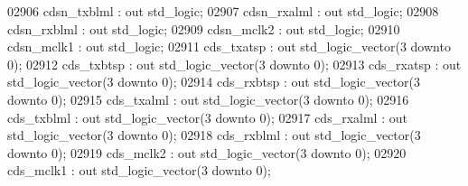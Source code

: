 \begin{DoxyCode}
02906     cdsn\_txblml   : \textcolor{keywordflow}{out} \textcolor{comment}{std\_logic};
02907     cdsn\_rxalml   : \textcolor{keywordflow}{out} \textcolor{comment}{std\_logic};
02908     cdsn\_rxblml   : \textcolor{keywordflow}{out} \textcolor{comment}{std\_logic};
02909     cdsn\_mclk2    : \textcolor{keywordflow}{out} \textcolor{comment}{std\_logic};
02910     cdsn\_mclk1    : \textcolor{keywordflow}{out} \textcolor{comment}{std\_logic};
02911     cds\_txatsp    : \textcolor{keywordflow}{out} \textcolor{comment}{std\_logic\_vector}(\textcolor{vhdllogic}{}\textcolor{vhdllogic}{3} \textcolor{keywordflow}{downto} \textcolor{vhdllogic}{}\textcolor{vhdllogic}{0});
02912     cds\_txbtsp    : \textcolor{keywordflow}{out} \textcolor{comment}{std\_logic\_vector}(\textcolor{vhdllogic}{}\textcolor{vhdllogic}{3} \textcolor{keywordflow}{downto} \textcolor{vhdllogic}{}\textcolor{vhdllogic}{0});
02913     cds\_rxatsp    : \textcolor{keywordflow}{out} \textcolor{comment}{std\_logic\_vector}(\textcolor{vhdllogic}{}\textcolor{vhdllogic}{3} \textcolor{keywordflow}{downto} \textcolor{vhdllogic}{}\textcolor{vhdllogic}{0});
02914     cds\_rxbtsp    : \textcolor{keywordflow}{out} \textcolor{comment}{std\_logic\_vector}(\textcolor{vhdllogic}{}\textcolor{vhdllogic}{3} \textcolor{keywordflow}{downto} \textcolor{vhdllogic}{}\textcolor{vhdllogic}{0});
02915     cds\_txalml    : \textcolor{keywordflow}{out} \textcolor{comment}{std\_logic\_vector}(\textcolor{vhdllogic}{}\textcolor{vhdllogic}{3} \textcolor{keywordflow}{downto} \textcolor{vhdllogic}{}\textcolor{vhdllogic}{0});
02916     cds\_txblml    : \textcolor{keywordflow}{out} \textcolor{comment}{std\_logic\_vector}(\textcolor{vhdllogic}{}\textcolor{vhdllogic}{3} \textcolor{keywordflow}{downto} \textcolor{vhdllogic}{}\textcolor{vhdllogic}{0});
02917     cds\_rxalml    : \textcolor{keywordflow}{out} \textcolor{comment}{std\_logic\_vector}(\textcolor{vhdllogic}{}\textcolor{vhdllogic}{3} \textcolor{keywordflow}{downto} \textcolor{vhdllogic}{}\textcolor{vhdllogic}{0});
02918     cds\_rxblml    : \textcolor{keywordflow}{out} \textcolor{comment}{std\_logic\_vector}(\textcolor{vhdllogic}{}\textcolor{vhdllogic}{3} \textcolor{keywordflow}{downto} \textcolor{vhdllogic}{}\textcolor{vhdllogic}{0});
02919     cds\_mclk2    :  \textcolor{keywordflow}{out} \textcolor{comment}{std\_logic\_vector}(\textcolor{vhdllogic}{}\textcolor{vhdllogic}{3} \textcolor{keywordflow}{downto} \textcolor{vhdllogic}{}\textcolor{vhdllogic}{0});
02920     cds\_mclk1    :  \textcolor{keywordflow}{out} \textcolor{comment}{std\_logic\_vector}(\textcolor{vhdllogic}{}\textcolor{vhdllogic}{3} \textcolor{keywordflow}{downto} \textcolor{vhdllogic}{}\textcolor{vhdllogic}{0});

\end{DoxyCode}
